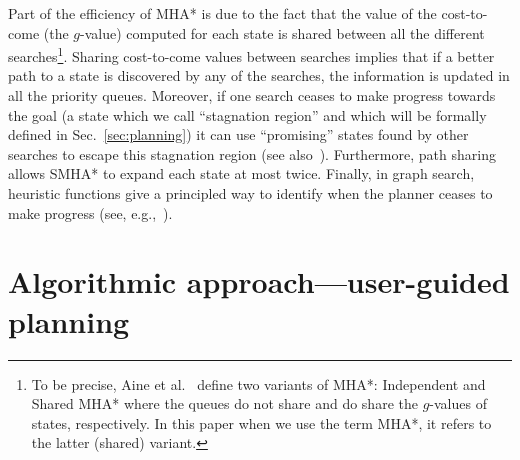 \documentclass{article}
\begin{document}
Part of the efficiency of MHA* is due to the fact that the value of the cost-to-come (the $g$-value) computed for each state is shared between all the different searches\footnote{To be precise, Aine et al.~\cite{ASNHL16} define two variants of MHA*: Independent and Shared MHA* where the queues do not share and do share the $g$-values of states, respectively. In this paper when we use the term MHA*, it refers to the latter (shared) variant.}.
Sharing cost-to-come values between searches implies that if a better path to a state is discovered by any of the searches, the information is updated in all the
priority queues. 
Moreover, if one search ceases to make progress towards the goal (a state which we call ``stagnation region'' and which will be formally defined in Sec.~\ref{sec:planning}) it can use ``promising'' states found by other searches to escape this stagnation region (see also~\cite{HB12,I92}).
Furthermore, path sharing allows SMHA* to expand each state at most twice.
Finally, in graph search, heuristic functions give a principled way to identify when the planner ceases to make progress (see, e.g.,~\cite{VNL17}).


%
%




\section{Algorithmic approach---user-guided planning}
\label{sec:high}
\end{document}
